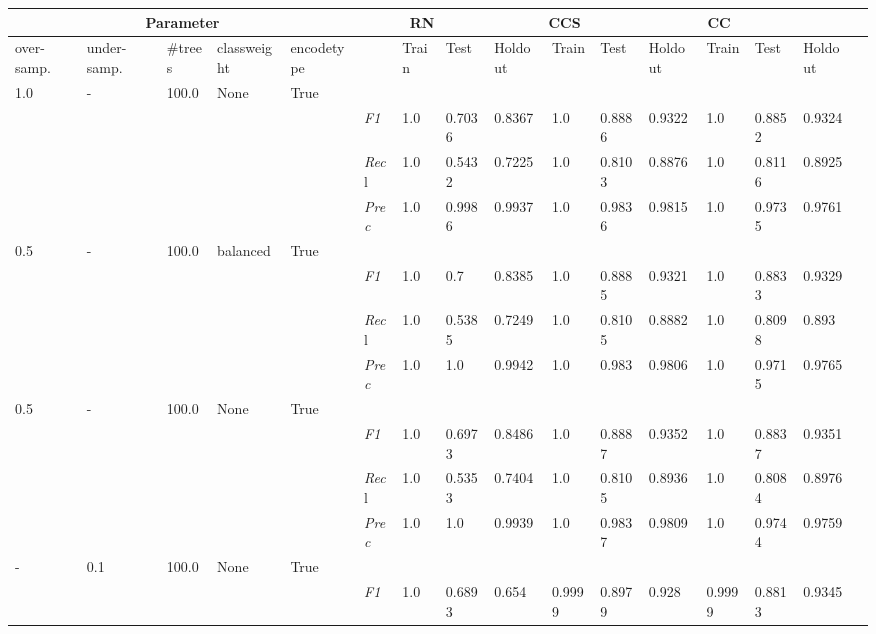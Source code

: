 \begin{table}[]
    \tiny
    \tabcolsep=0.11cm
    \begin{tabularx}{\textwidth}{XXXXX|X|XXX|XXX|XXXX}
    \toprule
    \multicolumn{5}{c}{Parameter} & \multicolumn{3}{c}{RN} & \multicolumn{3}{c}{CCS} & \multicolumn{3}{c}{CC} \\ \midrule
    over-\newline samp. & under-\newline samp. & \#trees & class\newline weight & encode\newline type  & & Train &  Test & Holdout & Train &  Test & Holdout & Train &  Test & Holdout \\ \midrule
    1.0 & - & 100.0 & None & True& & & & & & & & & \\
    & & & & & \textit{F1} & 1.0 & 0.7036 & 0.8367 & 1.0 & 0.8886        & 0.9322        & 1.0        & 0.8852        & 0.9324        \\
    & & & & & \textit{Rec}l & 1.0 & 0.5432 & 0.7225    & 1.0 & 0.8103    & 0.8876    & 1.0    & 0.8116    & 0.8925    \\
    & & & & & \textit{Prec} & 1.0 & 0.9986 & 0.9937 & 1.0 & 0.9836 & 0.9815 & 1.0 & 0.9735 & 0.9761 \\ \midrule
    0.5 & - & 100.0 & balanced & True& & & & & & & & & \\
    & & & & & \textit{F1} & 1.0 & 0.7 & 0.8385 & 1.0 & 0.8885        & 0.9321        & 1.0        & 0.8833        & 0.9329        \\
    & & & & & \textit{Rec}l & 1.0 & 0.5385 & 0.7249    & 1.0 & 0.8105    & 0.8882    & 1.0    & 0.8098    & 0.893    \\
    & & & & & \textit{Prec} & 1.0 & 1.0 & 0.9942 & 1.0 & 0.983 & 0.9806 & 1.0 & 0.9715 & 0.9765 \\ \midrule
    0.5 & - & 100.0 & None & True& & & & & & & & & \\
    & & & & & \textit{F1} & 1.0 & 0.6973 & 0.8486 & 1.0 & 0.8887        & 0.9352        & 1.0        & 0.8837        & 0.9351        \\
    & & & & & \textit{Rec}l & 1.0 & 0.5353 & 0.7404    & 1.0 & 0.8105    & 0.8936    & 1.0    & 0.8084    & 0.8976    \\
    & & & & & \textit{Prec} & 1.0 & 1.0 & 0.9939 & 1.0 & 0.9837 & 0.9809 & 1.0 & 0.9744 & 0.9759 \\ \midrule
    - & 0.1 & 100.0 & None & True& & & & & & & & & \\
    & & & & & \textit{F1} & 1.0 & 0.6893 & 0.654 & 0.9999 & 0.8979        & 0.928        & 0.9999        & 0.8813        & 0.9345        \\

\end{tabularx}
\end{table}
